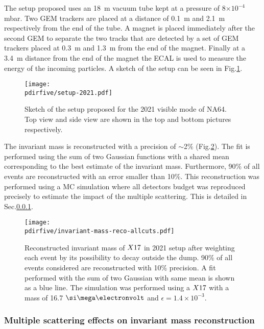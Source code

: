 The setup proposed uses an \SI{18}{\meter} vacuum tube kept at a pressure of 8$\times 10^{-4}$ \si{\milli\bar}. Two GEM trackers \cite{gem} are placed at a distance of \SI{0.1}{\meter} and \SI{2.1}{\meter} respectively from the end of the tube. A magnet is placed immediately after the second GEM to separate the two tracks that are detected by a set of GEM trackers placed at \SI{0.3}{\meter} and \SI{1.3}{\meter} from the end of the magnet. Finally at a \SI{3.4}{\meter} distance from the end of the magnet the ECAL is used to measure the energy of the incoming particles. A sketch of the setup can be seen in Fig.\ref{fig:setup-2021}.

\begin{figure}[tbh!]
  \centering
  \texttt{[image: \\pdirfive/setup-2021.pdf]}
  \caption[2021 setup]{Sketch of the setup proposed for the 2021 visible mode of NA64. Top view and side view are shown in the top and bottom pictures respectively.}
  \label{fig:setup-2021}
\end{figure}

The invariant mass is reconstructed with a precision of $\sim$2\% (Fig.\ref{fig:imassreco}). The fit is performed using the sum of two Gaussian functions with a shared mean corresponding to the best estimate of the invariant mass. Furthermore, 90\% of all events are reconstructed with an error smaller than 10\%. This reconstruction was performed using a MC simulation where all detectors budget was reproduced precisely to estimate the impact of the multiple scattering. This is detailed in Sec.\ref{ch5:sec:mm-scattering}.


\begin{figure}[tbh!]
  \centering
  \texttt{[image: \\pdirfive/invariant-mass-reco-allcuts.pdf]}
  \caption[Invariant mass reconstruction in 2021 setup]{Reconstructed invariant mass of $X17$ in 2021 setup after weighting each event by its possibility to decay outside the dump. 90\% of all events considered are reconstructed with 10\% precision. A fit performed with the sum of two Gaussian with same mean is shown as a blue line. The simulation was performed using a $X17$ with a mass of 16.7 $\mev$ and $\epsilon = 1.4\times10^{-3}$.}
    \label{fig:imassreco}
  \end{figure}

\subsubsection{Multiple scattering effects on invariant mass reconstruction}
\label{ch5:sec:mm-scattering}

